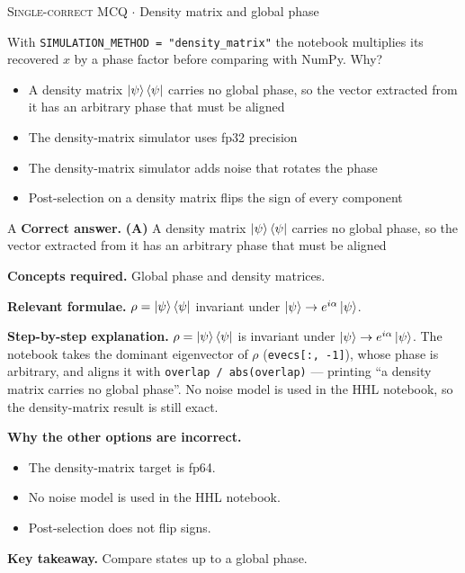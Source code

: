 \documentclass[11pt,a4paper]{article}
\newcommand{\optlabel}[1]{\textbf{(#1)}}
\newcommand{\correctlabel}[1]{\textcolor{okgreen}{\textbf{(#1)}\,\ding{51}}}
\newenvironment{qitem}[1]{\begin{list}{}{\setlength{\leftmargin}{3.3em}\setlength{\labelwidth}{3.1em}%
  \setlength{\labelsep}{0.2em}\setlength{\topsep}{3pt}\setlength{\parsep}{3pt}}\item[\textbf{Q.#1}\hfill]}{\end{list}}
\newcommand{\qsep}{\par\vspace{2pt}{\color{black!15}\hrule}\vspace{4pt}}
\newcommand{\qmeta}[2]{{\footnotesize\color{black!60}\textsc{#1} \;$\cdot$\; #2}\par}
\begin{document}
\begin{qitem}{73}
\qmeta{Single-correct MCQ}{Density matrix and global phase}
With \texttt{SIMULATION\_METHOD = "density\_matrix"} the notebook multiplies its recovered $x$ by a phase factor before comparing with NumPy. Why?
\begin{itemize}[leftmargin=2.6em, labelsep=0.4em, itemsep=2pt, topsep=3pt]
\item[\correctlabel{A}] A density matrix $\ket\psi\bra\psi$ carries no global phase, so the vector extracted from it has an arbitrary phase that must be aligned
\item[\optlabel{B}] The density-matrix simulator uses fp32 precision
\item[\optlabel{C}] The density-matrix simulator adds noise that rotates the phase
\item[\optlabel{D}] Post-selection on a density matrix flips the sign of every component
\end{itemize}
\end{qitem}
\begin{solbox}{A}
\textbf{\color{brand}Correct answer.} \textcolor{okgreen}{\textbf{(A)}} A density matrix $\ket\psi\bra\psi$ carries no global phase, so the vector extracted from it has an arbitrary phase that must be aligned

\textbf{\color{brand}Concepts required.} Global phase and density matrices.

\textbf{\color{brand}Relevant formulae.} $\rho = \ket\psi\bra\psi$ invariant under $\ket\psi \to e^{i\alpha}\ket\psi$.

\textbf{\color{brand}Step-by-step explanation.} $\rho = \ket\psi\bra\psi$ is invariant under $\ket\psi \to e^{i\alpha}\ket\psi$. The notebook takes the dominant eigenvector of $\rho$ (\texttt{evecs[:, -1]}), whose phase is arbitrary, and aligns it with
\texttt{overlap / abs(overlap)} --- printing ``a density matrix carries no global phase''. No noise model is used in the HHL notebook, so the density-matrix result is still exact.

\textbf{\color{brand}Why the other options are incorrect.}
\begin{itemize}[leftmargin=2.4em, itemsep=1pt, topsep=2pt]
\item[\textbf{(B)}] The density-matrix target is fp64.
\item[\textbf{(C)}] No noise model is used in the HHL notebook.
\item[\textbf{(D)}] Post-selection does not flip signs.
\end{itemize}
\textbf{\color{brand}Key takeaway.} Compare states up to a global phase.
\end{solbox}
\qsep
\end{document}
